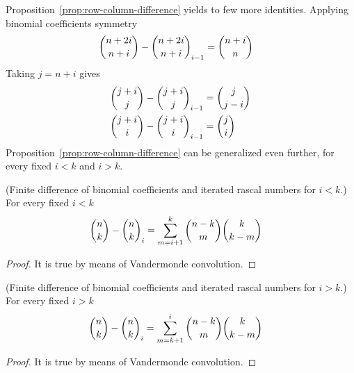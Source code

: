 Proposition~\eqref{prop:row-column-difference} yields to few more identities.
Applying binomial coefficients symmetry
\begin{align*}
    \binom{n+2i}{n+i} - \binom{n+2i}{n+i}_{i-1} &= \binom{n+i}{n}
\end{align*}
Taking $j=n+i$ gives
\begin{align*}
    \binom{j+i}{j} - \binom{j+i}{j}_{i-1} &= \binom{j}{j-i} \\
    \binom{j+i}{i} - \binom{j+i}{i}_{i-1} &= \binom{j}{i}
\end{align*}
Proposition~\eqref{prop:row-column-difference} can be generalized even further, for every fixed $i<k$ and $i>k$.
\begin{proposition}
(Finite difference of binomial coefficients and iterated rascal numbers for $i<k$.)
    For every fixed $i<k$
    \label{prop:row-column-difference-general}
    \begin{align*}
        \binom{n}{k} - \binom{n}{k}_{i} &= \sum_{m=i+1}^{k} \binom{n-k}{m} \binom{k}{k-m}
    \end{align*}
    \begin{proof}
        It is true by means of Vandermonde convolution.
    \end{proof}
\end{proposition}
\begin{proposition}
(Finite difference of binomial coefficients and iterated rascal numbers for $i>k$.)
    For every fixed $i>k$
    \label{prop:row-column-difference-general-i-greater-k}
    \begin{align*}
        \binom{n}{k} - \binom{n}{k}_{i} &= \sum_{m=k+1}^{i} \binom{n-k}{m} \binom{k}{k-m}
    \end{align*}
    \begin{proof}
        It is true by means of Vandermonde convolution.
    \end{proof}
\end{proposition}
